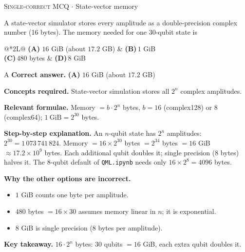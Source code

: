 \documentclass[11pt,a4paper]{article}
\newcommand{\optlabel}[1]{\textbf{(#1)}}
\newcommand{\correctlabel}[1]{\textcolor{okgreen}{\textbf{(#1)}\,\ding{51}}}
\newenvironment{qitem}[1]{\begin{list}{}{\setlength{\leftmargin}{3.3em}\setlength{\labelwidth}{3.1em}%
  \setlength{\labelsep}{0.2em}\setlength{\topsep}{3pt}\setlength{\parsep}{3pt}}\item[\textbf{Q.#1}\hfill]}{\end{list}}
\newcommand{\qsep}{\par\vspace{2pt}{\color{black!15}\hrule}\vspace{4pt}}
\newcommand{\qmeta}[2]{{\footnotesize\color{black!60}\textsc{#1} \;$\cdot$\; #2}\par}
\begin{document}
\begin{qitem}{33}
\qmeta{Single-correct MCQ}{State-vector memory}
A state-vector simulator stores every amplitude as a double-precision complex number (16 bytes). The memory
needed for one 30-qubit state is
\par\smallskip\noindent\begin{tabularx}{\linewidth}{@{}*{2}{L}@{}}
\correctlabel{A}\,$16$ GiB (about $17.2$ GB) & \optlabel{B}\,$1$ GiB \\[3pt]
\optlabel{C}\,$480$ bytes & \optlabel{D}\,$8$ GiB
\end{tabularx}
\end{qitem}
\begin{solbox}{A}
\textbf{\color{brand}Correct answer.} \textcolor{okgreen}{\textbf{(A)}} $16$ GiB (about $17.2$ GB)

\textbf{\color{brand}Concepts required.} State-vector simulation stores all $2^n$ complex amplitudes.

\textbf{\color{brand}Relevant formulae.} Memory $= b\cdot2^n$ bytes, $b = 16$ (complex128) or $8$ (complex64); $1\ \text{GiB} = 2^{30}$ bytes.

\textbf{\color{brand}Step-by-step explanation.} An $n$-qubit state has $2^n$ amplitudes: $2^{30} = 1\,073\,741\,824$. Memory $= 16 \times 2^{30}$ bytes
$= 2^{34}$ bytes $= 16$ GiB $\approx 17.2\times10^9$ bytes. Each additional qubit doubles it; single precision (8 bytes)
halves it. The 8-qubit default of \texttt{QML.ipynb} needs only $16\times2^8 = 4096$ bytes.

\textbf{\color{brand}Why the other options are incorrect.}
\begin{itemize}[leftmargin=2.4em, itemsep=1pt, topsep=2pt]
\item[\textbf{(B)}] $1$ GiB counts one byte per amplitude.
\item[\textbf{(C)}] $480$ bytes $= 16\times30$ assumes memory linear in $n$; it is exponential.
\item[\textbf{(D)}] $8$ GiB is single precision (8 bytes per amplitude).
\end{itemize}
\textbf{\color{brand}Key takeaway.} $16\cdot2^n$ bytes: 30 qubits $= 16$ GiB, each extra qubit doubles it.
\end{solbox}
\qsep
\end{document}
